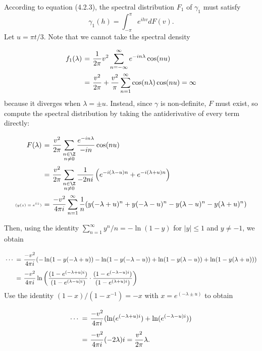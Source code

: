 According to equation (4.2.3), the spectral distribution $F_1$ of $\gamma_1$ must satisfy
\[ \gamma_1(h) = \int_{-\pi}^\pi e^{ihv} d F(v).  \]
Let $u = \pi t /3$. Note that we cannot take the spectral density
\[ \everymath{\displaystyle}
\arraycolsep=1.8pt\def\arraystretch{2.5}
\begin{array}{rcl}
    f_1(\lambda) & = & \frac{1}{2\pi} v^2 \sum_{n = -\infty}^{\infty} e^{-in\lambda} \cos(n u)\\
    & = & \frac{v^2}{2\pi} + \frac{v^2}{\pi} \sum_{n = 1}^{\infty} \cos(n\lambda) \cos(n u) = \infty
\end{array}\]
because it diverges when $\lambda = \pm u$. Instead, since $\gamma$ is non-definite, $F$ must exist, so compute the spectral distribution by taking the antiderivative of every term directly:
\[ \everymath{\displaystyle}
\arraycolsep=1.8pt\def\arraystretch{2.5}
\begin{array}{rcl}
    F(\lambda) 
    & = & \frac{v^2}{2\pi} \sum_{\substack{n \in \Z\\ n \neq 0}} \frac{e^{-in\lambda}}{-in} \cos(n u)\\
    & = & \frac{v^2}{2\pi} \sum_{\substack{n \in \Z\\ n \neq 0}} \frac{1}{-2ni} \left( e^{-i(\lambda - u)n} + e^{-i(\lambda + u)n}  \right)\\
    \mbox{\tiny $(y(z) = e^{iz})$}& = & \frac{-v^2}{4\pi i} \sum_{n = 1}^{\infty} \frac{1}{n} (y(-\lambda + u)^n + y(-\lambda - u)^n - y(\lambda - u)^n - y(\lambda + u)^n)
\end{array} \]

Then, using the identity $\sum_{n = 1}^{\infty} y^n/n = -\ln(1-y)$ for $|y| \leq 1$ and $y \neq -1$, we obtain
\[ \everymath{\displaystyle}
\arraycolsep=1.8pt\def\arraystretch{2.5}
\begin{array}{rcl}
    \cdots & = & \frac{-v^2}{4\pi i} (-\ln(1-y(-\lambda + u)) - \ln(1-y(-\lambda - u)) + \ln(1-y(\lambda - u)) + \ln(1-y(\lambda + u)))\\
    & = & \frac{-v^2}{4\pi i} \ln\left( \frac{(1-e^{(-\lambda + u)i})}{(1-e^{(\lambda - u)i})} \cdot \frac{(1-e^{(-\lambda - u)i})}{(1-e^{(\lambda + u)i})} \right)\\
\end{array} \]
Use the identity $(1-x)/(1-x^{-1}) = -x$ with $x = e^{(-\lambda\pm u)}$ to obtain
\[ \everymath{\displaystyle}
\arraycolsep=1.8pt\def\arraystretch{2.5}
\begin{array}{rcl}
    \cdots & = &\frac{-v^2}{4\pi i} (\ln(e^{(-\lambda + u)i}) + \ln(e^{(-\lambda - u)i}))\\
    & = & \frac{-v^2}{4\pi i} (-2\lambda)i = \frac{v^2}{2\pi} \lambda.
\end{array} \]

